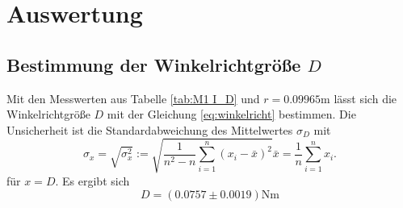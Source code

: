 \section{Auswertung} %
\label{sec:swrtng}


\subsection{Bestimmung der Winkelrichtgröße $D$}

Mit den Messwerten aus Tabelle \ref{tab:M1 I_D} und $r=0.09965\si{\meter}$ lässt sich die Winkelrichtgröße $D$ mit der Gleichung \eqref{eq:winkelricht} bestimmen. Die Unsicherheit ist die Standardabweichung des Mittelwertes $\sigma_D$ mit
\begin{subequations}
	\begin{equation}
		\sigma_x = \sqrt{\sigma_x^2} := \sqrt{\frac{1}{n^2-n} \sum_{i=1}^n{(x_i-\bar{x})^2}}
	\end{equation}
	\begin{equation}
		\bar{x} = \frac{1}{n} \sum_{i=1}^n{x_i}.
	\end{equation}
\end{subequations}
für $x=D$.
Es ergibt sich 
\begin{equation}
	\label{wert:Winkelricht}
	D=(0.0757\pm0.0019)\si{\newton\meter}
\end{equation}


